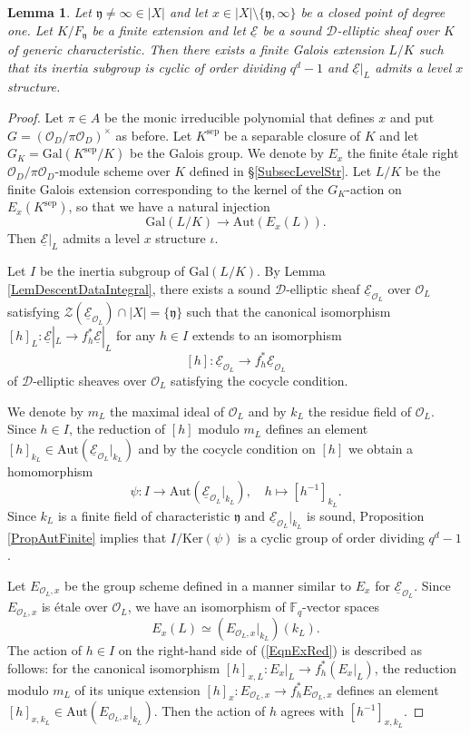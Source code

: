 \documentclass[10pt]{amsart}
\theoremstyle{plain}
\newtheorem{lem}[thm]{Lemma}
\theoremstyle{definition}
\newcommand{\Aut}{\mathrm{Aut}}
\newcommand{\Gal}{\mathrm{Gal}}
\newcommand{\Ker}{\mathrm{Ker}}
\newcommand{\sep}{\mathrm{sep}}
\newcommand{\cO}{\mathcal{O}}
\newcommand{\cZ}{\mathcal{Z}}
\newcommand{\ucE}{\underline{\mathcal{E}}}
\newcommand{\bF}{\mathbb{F}}
\newcommand{\sD}{\mathscr{D}}
\newcommand{\fry}{\mathfrak{y}}
\begin{document}
\begin{lem}\label{LemLevelxStrOverTame}
	Let $\fry\neq \infty\in |X|$ and let $x\in |X|\setminus\{\fry,\infty\}$ be a closed point of degree one.
	Let $K/F_\fry$ be a finite extension and let $\ucE$ be a sound $\sD$-elliptic sheaf over $K$ of generic characteristic.
	Then there exists a finite Galois extension $L/K$ such that its inertia subgroup is cyclic of order dividing $q^d-1$ and 
	$\ucE|_L$ admits a level $x$ structure.
\end{lem}
\begin{proof}
	Let $\pi\in A$ be the monic irreducible polynomial that defines $x$ and put $G=(\cO_D/\pi\cO_D)^\times$ as before.
	Let $K^\sep$ be a separable closure of $K$ and let $G_K=\Gal(K^\sep/K)$ be the Galois group.
	We denote by $E_x$ the finite \'{e}tale right $\cO_D/\pi\cO_D$-module scheme over $K$ defined in \S\ref{SubsecLevelStr}.
	Let $L/K$ be the finite Galois extension corresponding to the kernel of the $G_K$-action on $E_x(K^\sep)$,
	so that we have a natural injection
	\begin{equation}\label{EqnGalExInj}
		\Gal(L/K)\to \Aut(E_x(L)).
	\end{equation}
	Then $\ucE|_{L}$ admits a level $x$ structure $\iota$.
	
	Let $I$ be the inertia subgroup of $\Gal(L/K)$.
	By Lemma \ref{LemDescentDataIntegral}, there exists a sound $\sD$-elliptic sheaf $\ucE_{\cO_L}$ over $\cO_L$
	satisfying $\cZ(\ucE_{\cO_L})\cap|X|=\{\fry\}$
	such that the canonical isomorphism $[h]_L:\ucE|_L\to f_h^* \ucE|_L$ for any $h\in I$ extends to an isomorphism 
	\[
	[h]: \ucE_{\cO_L}\to f_h^*\ucE_{\cO_L}
	\]
	of $\sD$-elliptic sheaves over $\cO_L$ satisfying the cocycle condition.
	
	
	
	
	We denote by $m_L$ the maximal ideal of $\cO_L$ and by $k_L$ the residue field of $\cO_L$.
	Since $h\in I$, the reduction of $[h]$ modulo $m_L$ defines an element $[h]_{k_L}\in \Aut(\ucE_{\cO_L}|_{k_L})$ and 
	by the cocycle condition on $[h]$ we obtain a homomorphism
	\[
	\psi: I\to \Aut(\ucE_{\cO_L}|_{k_L}),\quad h\mapsto [h^{-1}]_{k_L}.
	\]
	Since $k_L$ is a finite field of characteristic $\fry$ and $\ucE_{\cO_L}|_{k_L}$ is sound, Proposition \ref{PropAutFinite} implies
	that $I/\Ker(\psi)$ is a cyclic group of order dividing $q^d-1$.
	
	Let $E_{\cO_L,x}$ be the group scheme defined in a manner similar to $E_x$ for $\ucE_{\cO_L}$.
	Since $E_{\cO_L,x}$ is \'{e}tale over $\cO_L$,
	we have an isomorphism of $\bF_q$-vector spaces
	\begin{equation}\label{EqnExRed}
	E_x(L)\simeq (E_{\cO_L,x}|_{k_L})(k_L).
	\end{equation}
	The action of $h\in I$ on the right-hand side of (\ref{EqnExRed}) is described as follows: 
	for the canonical isomorphism $[h]_{x,L}: E_x|_L\to f_h^*(E_x|_L)$, the reduction modulo $m_L$ of its unique extension 
	$[h]_x:E_{\cO_L,x}\to f_{h}^* E_{\cO_L,x}$ defines an element $[h]_{x,k_L}\in \Aut(E_{\cO_L,x}|_{k_L})$. Then the action of $h$ agrees with
	$[h^{-1}]_{x,k_L}$.
	

\end{proof}
\end{document}
